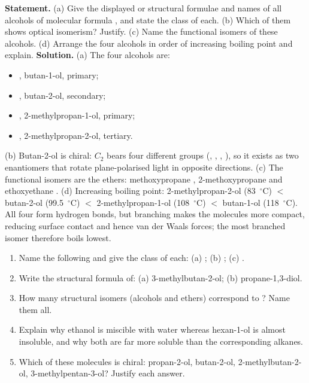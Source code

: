 \documentclass[11pt]{article}
\begin{document}
\begin{exoresolu}
\textbf{Statement.} (a) Give the displayed or structural formulae and names of all alcohols of molecular formula , and state the class of each. (b) Which of them shows optical isomerism? Justify. (c) Name the functional isomers of these alcohols. (d) Arrange the four alcohols in order of increasing boiling point and explain.
\tcblower
\textbf{Solution.} (a) The four alcohols are:
\begin{itemize}
\item {}, butan-1-ol, primary;
\item {}, butan-2-ol, secondary;
\item {}, 2-methylpropan-1-ol, primary;
\item {}, 2-methylpropan-2-ol, tertiary.
\end{itemize}
(b) Butan-2-ol is chiral: $C_2$ bears four different groups (, , , ), so it exists as two enantiomers that rotate plane-polarised light in opposite directions.
(c) The functional isomers are the ethers: methoxypropane , 2-methoxypropane  and ethoxyethane .
(d) Increasing boiling point: 2-methylpropan-2-ol (\SI{83}{\ensuremath{{}^{\circ}\mathrm{C}}}) $<$ butan-2-ol (\SI{99.5}{\ensuremath{{}^{\circ}\mathrm{C}}}) $<$ 2-methylpropan-1-ol (\SI{108}{\ensuremath{{}^{\circ}\mathrm{C}}}) $<$ butan-1-ol (\SI{118}{\ensuremath{{}^{\circ}\mathrm{C}}}). All four form hydrogen bonds, but branching makes the molecules more compact, reducing surface contact and hence van der Waals forces; the most branched isomer therefore boils lowest.
\end{exoresolu}

\begin{exercice}
\begin{enumerate}
\item Name the following and give the class of each: (a) ; (b) ; (c) .
\item Write the structural formula of: (a) 3-methylbutan-2-ol; (b) propane-1,3-diol.
\item How many structural isomers (alcohols and ethers) correspond to ? Name them all.
\item Explain why ethanol is miscible with water whereas hexan-1-ol is almost insoluble, and why both are far more soluble than the corresponding alkanes.
\item Which of these molecules is chiral: propan-2-ol, butan-2-ol, 2-methylbutan-2-ol, 3-methylpentan-3-ol? Justify each answer.
\end{enumerate}
\end{exercice}
\end{document}
